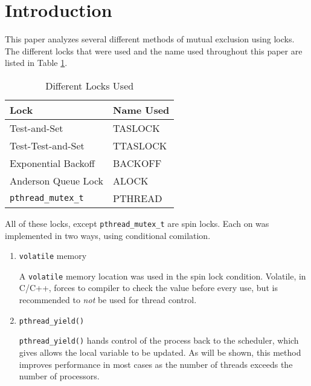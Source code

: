 \section{Introduction}

This paper analyzes several different methods of mutual exclusion using locks.
The different locks that were used and the name used throughout this paper are listed in Table \ref{table:locks}.

\begin{table}[hp]
    \caption{Different Locks Used}
    \begin{center}
        \begin{tabular}{|l|l|}
            \hline Lock & Name Used \\
            \hline Test-and-Set & TASLOCK \\
            \hline Test-Test-and-Set & TTASLOCK \\
            \hline Exponential Backoff & BACKOFF \\
            \hline Anderson Queue Lock & ALOCK \\
            \hline \verb+pthread_mutex_t+ & PTHREAD \\
            \hline
        \end{tabular}
    \end{center}
    \label{table:locks}
\end{table}

All of these locks, except \verb+pthread_mutex_t+ are spin locks.
Each on was implemented in two ways, using conditional comilation.
\begin{enumerate}
    \item \verb+volatile+ memory

        A \verb+volatile+ memory location was used in the spin lock condition.
        Volatile, in C/C++, forces to compiler to check the value before every use, but is recommended to \emph{not} be used for thread control.
    \item \verb+pthread_yield()+

        \verb+pthread_yield()+ hands control of the process back to the scheduler, which gives allows the local variable to be updated.
        As will be shown, this method improves performance in most cases as the number of threads exceeds the number of processors.
\end{enumerate}

